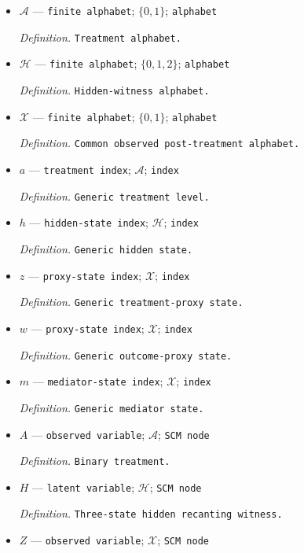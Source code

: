 \documentclass{article}
\begin{document}
\begin{itemize}
  \item \(\mathcal A\) --- \texttt{finite alphabet}; \(\{0,1\}\); \texttt{alphabet}
  \par\smallskip\noindent\emph{Definition.} \texttt{Treatment alphabet.}
  \item \(\mathcal H\) --- \texttt{finite alphabet}; \(\{0,1,2\}\); \texttt{alphabet}
  \par\smallskip\noindent\emph{Definition.} \texttt{Hidden-\allowbreak{}witness alphabet.}
  \item \(\mathcal X\) --- \texttt{finite alphabet}; \(\{0,1\}\); \texttt{alphabet}
  \par\smallskip\noindent\emph{Definition.} \texttt{Common observed post-\allowbreak{}treatment alphabet.}
  \item \(a\) --- \texttt{treatment index}; \(\mathcal A\); \texttt{index}
  \par\smallskip\noindent\emph{Definition.} \texttt{Generic treatment level.}
  \item \(h\) --- \texttt{hidden-\allowbreak{}state index}; \(\mathcal H\); \texttt{index}
  \par\smallskip\noindent\emph{Definition.} \texttt{Generic hidden state.}
  \item \(z\) --- \texttt{proxy-\allowbreak{}state index}; \(\mathcal X\); \texttt{index}
  \par\smallskip\noindent\emph{Definition.} \texttt{Generic treatment-\allowbreak{}proxy state.}
  \item \(w\) --- \texttt{proxy-\allowbreak{}state index}; \(\mathcal X\); \texttt{index}
  \par\smallskip\noindent\emph{Definition.} \texttt{Generic outcome-\allowbreak{}proxy state.}
  \item \(m\) --- \texttt{mediator-\allowbreak{}state index}; \(\mathcal X\); \texttt{index}
  \par\smallskip\noindent\emph{Definition.} \texttt{Generic mediator state.}
  \item \(A\) --- \texttt{observed variable}; \(\mathcal A\); \texttt{SCM node}
  \par\smallskip\noindent\emph{Definition.} \texttt{Binary treatment.}
  \item \(H\) --- \texttt{latent variable}; \(\mathcal H\); \texttt{SCM node}
  \par\smallskip\noindent\emph{Definition.} \texttt{Three-\allowbreak{}state hidden recanting witness.}
  \item \(Z\) --- \texttt{observed variable}; \(\mathcal X\); \texttt{SCM node}

\end{itemize}
\end{document}
